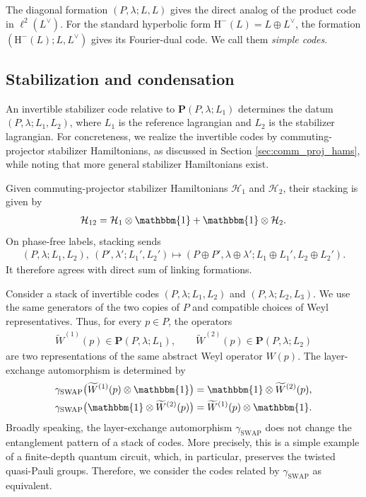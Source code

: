 \documentclass[sn-mathphys-num]{sn-jnl}
\theoremstyle{definition}
\numberwithin{equation}{section}
\theoremstyle{definition}
\def\CH {{\mathcal H}}
\def\hm{{\mbox{H}}^{-}}
\def\l{{\lambda}}
\newcommand{\id}{\mathbbm{1}}
\begin{document}
The diagonal formation $(P,\l;L,L)$ gives the direct analog of the product code in $\ell^2(L^{\vee})$. For the
standard hyperbolic form $\hm(L)=L\oplus L^{\vee}$, the formation
$(\hm(L);L,L^{\vee})$ gives its Fourier-dual code. We call them \textit{simple
codes}.


\subsection{Stabilization and condensation}
\label{sec:witt_equivalence_codes}

An invertible stabilizer code relative to
$\textbf{P}(P,\l;L_1)$ determines the datum
$(P,\l;L_1,L_2)$, where $L_1$ is the reference lagrangian and $L_2$ is
the stabilizer lagrangian. For concreteness, we realize the invertible codes by commuting-projector stabilizer Hamiltonians, as discussed in Section \ref{sec:comm_proj_hams}, while noting that more general stabilizer Hamiltonians exist.

Given commuting-projector stabilizer Hamiltonians $\CH_1$ and $\CH_2$, their stacking is given by
\begin{align}\label{eq:stacked_Ham}
    \CH_{12}=\CH_1\otimes\id+\id\otimes\CH_2.
\end{align}
On phase-free labels, stacking sends
\begin{align}
    (P,\l;L_1,L_2),\ (P',\l';L_1',L_2')
    \longmapsto
    (P\oplus P',\l\oplus\l';
      L_1\oplus L_1',L_2\oplus L_2').
\end{align}
It therefore agrees with direct sum of linking formations.

Consider a stack of invertible codes $(P,\l;L_1,L_2)$ and
$(P,\l;L_2,L_3)$. We use the same generators of the two copies of $P$
and compatible choices of Weyl representatives. Thus, for every
$p\in P$, the operators
\begin{align}
    \widetilde W^{(1)}(p)\in\textbf{P}(P,\l;L_1),
    \qquad
    \widetilde W^{(2)}(p)\in\textbf{P}(P,\l;L_2)
\end{align}
are two representations of the same abstract Weyl operator $W(p)$.
The layer-exchange automorphism is determined by
\begin{align}
    \gamma_{\mathrm{SWAP}}
    \bigl(\widetilde W^{(1)}(p)\otimes\id\bigr)
    &=
    \id\otimes\widetilde W^{(2)}(p),\\
    \gamma_{\mathrm{SWAP}}
    \bigl(\id\otimes\widetilde W^{(2)}(p)\bigr)
    &=
    \widetilde W^{(1)}(p)\otimes\id.
\end{align}
Broadly speaking, the layer-exchange automorphism $\gamma_{\mathrm{SWAP}}$ does not change the entanglement pattern of a stack of codes. More precisely, this is a simple example of a finite-depth quantum circuit, which, in particular, preserves the twisted quasi-Pauli groups. Therefore, we consider the codes related by $\gamma_{\mathrm{SWAP}}$ as equivalent.
\end{document}
